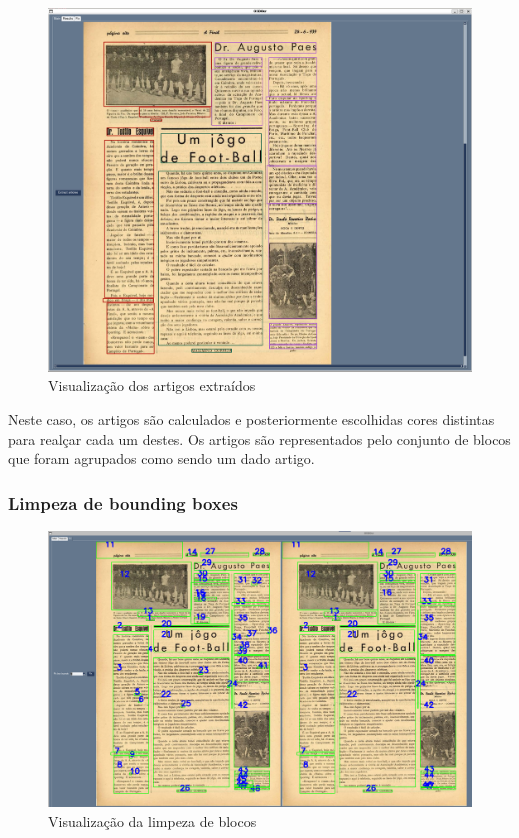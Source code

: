 \begin{figure}[H]
    \centering
    \includegraphics[width=1\textwidth]{images/implementacao/gui/gui_draw_articles.png}
    \caption{Visualização dos artigos extraídos}
    \label{fig:gui_draw_article}
\end{figure}

Neste caso, os artigos são calculados e posteriormente escolhidas cores distintas para realçar cada um destes. Os artigos são representados pelo conjunto de blocos que foram agrupados como sendo um dado artigo.

\subsubsection{Limpeza de bounding boxes}

\begin{figure}[H]
    \centering
    \includegraphics[width=1\textwidth]{images/implementacao/gui/gui_fix_blocks.png}
    \caption{Visualização da limpeza de blocos}
    \label{fig:gui_fix_bb}
\end{figure}

